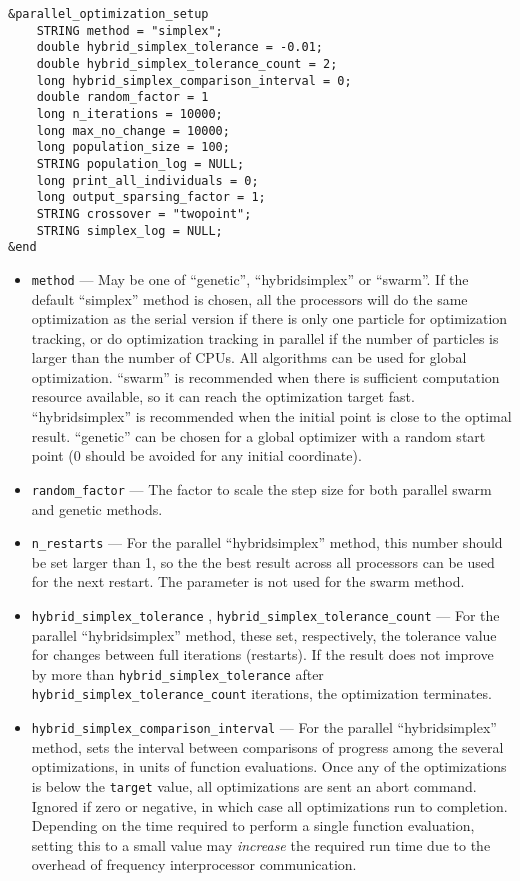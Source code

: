 \documentclass[11pt]{article}
\begin{document}
\begin{verbatim}
&parallel_optimization_setup
    STRING method = "simplex";
    double hybrid_simplex_tolerance = -0.01;
    double hybrid_simplex_tolerance_count = 2;
    long hybrid_simplex_comparison_interval = 0;
    double random_factor = 1
    long n_iterations = 10000;
    long max_no_change = 10000;
    long population_size = 100;
    STRING population_log = NULL;
    long print_all_individuals = 0;
    long output_sparsing_factor = 1;
    STRING crossover = "twopoint";
    STRING simplex_log = NULL;
&end
\end{verbatim}

\begin{itemize}
\item \verb|method| --- May be one of ``genetic'', ``hybridsimplex'' or ``swarm''. If the default ``simplex'' method is chosen, all the processors will do the same optimization as the serial version if there is only one particle for optimization tracking, or do optimization tracking in parallel if the number of particles is larger than the number of CPUs. All algorithms can be used for global optimization. ``swarm'' is recommended when there is sufficient computation resource available, so it can reach the optimization target fast. ``hybridsimplex'' is recommended when the initial point is close to the optimal result. ``genetic'' can be chosen for a global optimizer with a random start point (0 should be avoided for any initial coordinate). 

\item \verb|random_factor| --- The factor to scale the step size for both parallel swarm and genetic methods.

\item \verb|n_restarts| --- For the parallel ``hybridsimplex'' method, this number should be set larger than 1, so the the best result across all processors can be used for the next restart. The parameter is not used for the swarm method.

\item \verb|hybrid_simplex_tolerance| , \verb|hybrid_simplex_tolerance_count| --- For the parallel ``hybridsimplex'' method,
  these set, respectively, the tolerance value for changes between full iterations (restarts). If the result does not improve by
  more than \verb|hybrid_simplex_tolerance| after \verb|hybrid_simplex_tolerance_count| iterations, the optimization terminates.

\item \verb|hybrid_simplex_comparison_interval| --- For the parallel ``hybridsimplex'' method, sets the interval between
  comparisons of progress among the several optimizations, in units of function evaluations. Once any of the optimizations
  is below the \verb|target| value, all optimizations are sent an abort command.
  Ignored if zero or negative, in which case all optimizations run to completion.
  Depending on the time required to perform a single function evaluation, setting this to a small value 
  may {\em increase} the required run time due to the overhead of frequency interprocessor communication.


\end{itemize}
\end{document}
